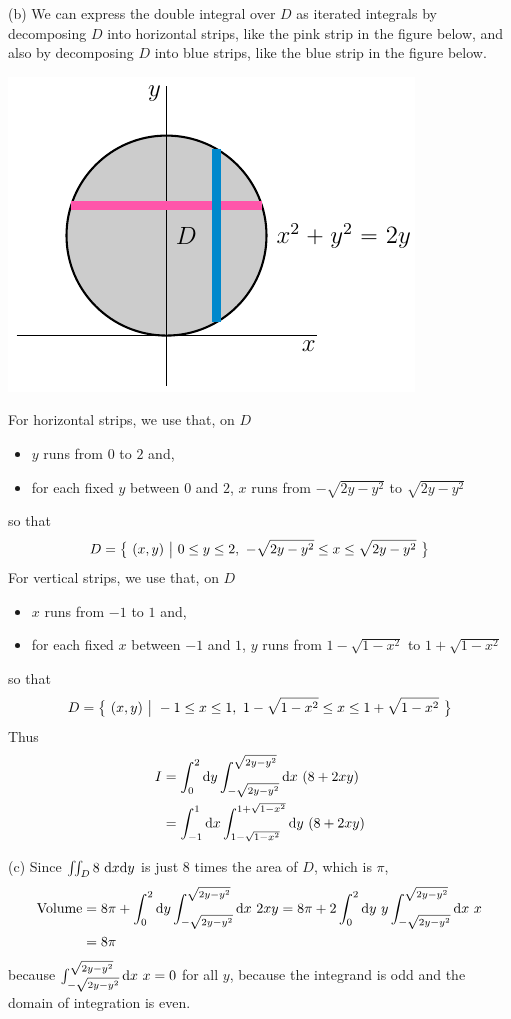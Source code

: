 \begin{solution}
(b)
We can express the double integral over $D$ as iterated integrals by
decomposing $D$ into horizontal strips, like the pink strip in the 
figure below, and also by decomposing $D$ into blue strips, like the 
blue strip in the figure below.
\begin{center}
     \includegraphics{fig/OE02AQ7.pdf} 
\end{center}
For horizontal strips, we use that, on $D$
\begin{itemize}
\item
$y$ runs from $0$ to $2$ and,
\item
for each fixed $y$ between $0$ and $2$, $x$ runs from $-\sqrt{2y-y^2}$
to $\sqrt{2y-y^2}$ 
\end{itemize}
so that
\begin{equation*}
D=\Set{(x,y)}{0\le y\le 2,\ -\sqrt{2y-y^2}\le x\le \sqrt{2y-y^2}}
\end{equation*}
For vertical strips, we use that, on $D$
\begin{itemize}
\item
$x$ runs from $-1$ to $1$ and,
\item
for each fixed $x$ between $-1$ and $1$, $y$ runs from $1-\sqrt{1-x^2}$
to $1+\sqrt{1-x^2}$ 
\end{itemize}
so that
\begin{equation*}
D=\Set{(x,y)}{-1\le x\le 1,\ 1-\sqrt{1-x^2}\le x\le 1+\sqrt{1-x^2}}
\end{equation*}
Thus
\begin{align*}
I&=\int_0^2 \dee{y}\int_{-\sqrt{2y-y^2}}^{\sqrt{2y-y^2}}\dee{x}\ (8+2xy) \\
 &=\int_{-1}^1 \dee{x}\int_{1-\sqrt{1-x^2}}^{1+\sqrt{1-x^2}}\dee{y}\ (8+2xy)
\end{align*}

(c) Since $\dblInt_D 8\ \dee{x}\dee{y}$ is just $8$ times the area of $D$,
which is $\pi$,
\begin{align*}
\text{Volume}&=8\pi+\int_0^2 \dee{y}\int_{-\sqrt{2y-y^2}}^{\sqrt{2y-y^2}}\dee{x}\ 2xy
=8\pi+2\int_0^2 \dee{y}\ y\int_{-\sqrt{2y-y^2}}^{\sqrt{2y-y^2}}\dee{x}\ x \\
&=8\pi
\end{align*}
because $\int_{-\sqrt{2y-y^2}}^{\sqrt{2y-y^2}}\dee{x}\ x=0$ for all $y$,
because the integrand is odd and the domain of integration is even.
\end{solution}

